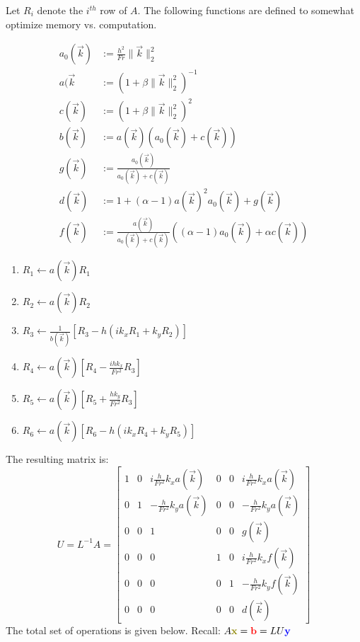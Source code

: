 \documentclass[10pt]{article}
\newcommand{\mbfb}[1]{{\color{blue}\mathbf{#1}}}
\newcommand{\mbfr}[1]{{\color{red}\mathbf{#1}}}
\newcommand{\mbfg}[1]{{\color{olive}\mathbf{#1}}}
\begin{document}
Let $R_i$ denote the $i^{th}$ row of $A$. 
The following functions are defined to somewhat optimize memory vs. computation.

\begin{align*}
a_0(\vec{k}) &:=\frac{h^2}{Fr}\|\vec{k}\|_2^2\\
a(\vec{k} &:= (1+\beta\|\vec{k}\|_2^2)^{-1}\\
c(\vec{k}) &:= (1+\beta\|\vec{k}\|_2^2)^2 \\
b(\vec{k}) &:= a(\vec{k})(a_0(\vec{k})+c(\vec{k}))\\
g(\vec{k}) &:= \frac{a_0(\vec{k})}{a_0(\vec{k})+c(\vec{k})} \\
d(\vec{k}) &:= 1+(\alpha-1)a(\vec{k})^2a_0(\vec{k})+g(\vec{k})\\
f(\vec{k}) &:= \frac{a(\vec{k})}{a_0(\vec{k})+c(\vec{k})} \left((\alpha-1)a_0(\vec{k}) + \alpha c(\vec{k})\right)
\end{align*}
\begin{enumerate}
	\item $R_1 \gets a(\vec{k}) R_1$
	\item $R_2 \gets a(\vec{k}) R_2$
	\item $R_3 \gets \frac{1}{b(\vec{k})}[R_3-h\left(ik_xR_1 +k_yR_2\right)]$
	\item $R_4 \gets a(\vec{k})[R_4-\frac{ihk_x}{Fr^2}R_3]$
	\item $R_5 \gets a(\vec{k})[R_5+\frac{hk_y}{Fr^2}R_3]$
	\item $R_6 \gets a(\vec{k})[R_6-h\left(ik_xR_4 +k_yR_5\right)]$
\end{enumerate}
The resulting matrix is: \[U = L^{-1}A = 
\begin{bmatrix}
1 & 0 & i \frac{h}{Fr^2}k_xa(\vec{k}) & 0 & 0 & i\frac{h}{Fr^2}k_xa(\vec{k}) \\
0 & 1 & -\frac{h}{Fr^2}k_ya(\vec{k}) & 0 & 0 & -\frac{h}{Fr^2}k_ya(\vec{k}) \\
0 & 0 & 1 & 0 & 0 & g(\vec{k}) \\ 
0 & 0 & 0 & 1 & 0 & i \frac{h}{Fr^2}k_x f(\vec{k}) \\
0 & 0 & 0 & 0 & 1 & -\frac{h}{Fr^2}k_y f(\vec{k}) \\
0 & 0 & 0 & 0 & 0 & d(\vec{k})
\end{bmatrix}\] 
The total set of operations is given below.
Recall:
$A\mbfg{x}=\mbfr{b} = LU\mbfb{y}$
\end{document}
